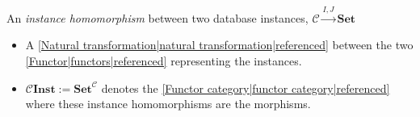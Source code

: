 
An \emph{instance homomorphism} between two database instances, $\mathcal{C}\xrightarrow{I,J}\mathbf{Set}$

\begin{itemize}
    \item  A \ref{Natural transformation|natural transformation|referenced} between the two \ref{Functor|functors|referenced} representing the instances.
    \item $\mathcal{C}\mathbf{Inst}:=\mathbf{Set}^\mathcal{C}$ denotes the \ref{Functor category|functor category|referenced} where these instance homomorphisms are the morphisms.

  \end{itemize}
